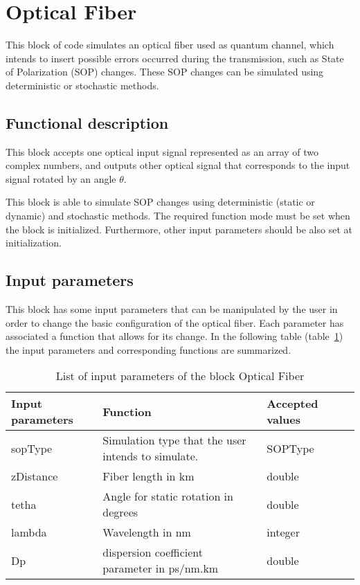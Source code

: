 \clearpage

\section{Optical Fiber}

This block of code simulates an optical fiber used as quantum channel, which intends to insert possible errors occurred during the transmission, such as State of Polarization (SOP) changes. These SOP changes can be simulated using deterministic or stochastic methods.


\subsection*{Functional description}

This block accepts one optical input signal represented as an array of two complex numbers, and outputs other optical signal that corresponds to the input signal rotated by an angle $\theta$. 

This block is able to simulate SOP changes using deterministic (static or dynamic) and stochastic methods. The required function mode must be set when the block is initialized. Furthermore, other input parameters should be also set at initialization.


\subsection*{Input parameters}

This block has some input parameters that can be manipulated by the user in order to change the basic configuration of the optical fiber. Each parameter has associated a function that allows for its change. In the following table (table~\ref{table}) the input parameters and corresponding functions are summarized.

\begin{table}[h]
	\begin{center}
		\begin{tabular}{| m{} | m{} |  m{} | m{4cm} | }
			\hline
			\textbf{Input parameters} & \textbf{Function} & \textbf{Accepted values} \\ \hline
			sopType                   & Simulation type that the user intends to simulate. & SOPType\\
            zDistance                 & Fiber length in km & double \\
            tetha                     & Angle for static rotation in degrees & double \\
            lambda                    & Wavelength in nm & integer \\
            Dp                        & dispersion coefficient parameter in ps/nm.km & double \\

			\hline
		\end{tabular}
		\caption{List of input parameters of the block Optical Fiber} \label{table}
	\end{center}
\end{table}



